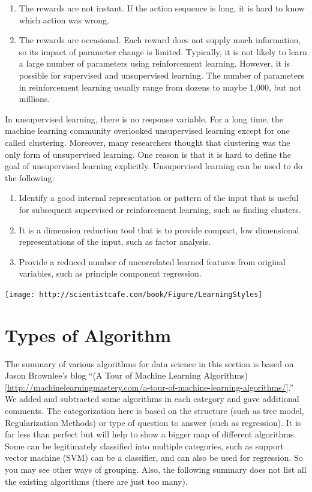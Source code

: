 \documentclass[]{book}
\theoremstyle{definition}
\theoremstyle{definition}
\theoremstyle{remark}
\begin{document}
\begin{enumerate}
\def\labelenumi{(\arabic{enumi})}
\item
  The rewards are not instant. If the action sequence is long, it is
  hard to know which action was wrong.
\item
  The rewards are occasional. Each reward does not supply much
  information, so its impact of parameter change is limited. Typically,
  it is not likely to learn a large number of parameters using
  reinforcement learning. However, it is possible for supervised and
  unsupervised learning. The number of parameters in reinforcement
  learning usually range from dozens to maybe 1,000, but not millions.
\end{enumerate}

In unsupervised learning, there is no response variable. For a long
time, the machine learning community overlooked unsupervised learning
except for one called clustering. Moreover, many researchers thought
that clustering was the only form of unsupervised learning. One reason
is that it is hard to define the goal of unsupervised learning
explicitly. Unsupervised learning can be used to do the following:

\begin{enumerate}
\def\labelenumi{(\arabic{enumi})}
\item
  Identify a good internal representation or pattern of the input that
  is useful for subsequent supervised or reinforcement learning, such as
  finding clusters.
\item
  It is a dimension reduction tool that is to provide compact, low
  dimensional representations of the input, such as factor analysis.
\item
  Provide a reduced number of uncorrelated learned features from
  original variables, such as principle component regression.
\end{enumerate}

\texttt{[image: http://scientistcafe.com/book/Figure/LearningStyles]}

\section{Types of Algorithm}\label{types-of-algorithm}

The summary of various algorithms for data science in this section is
based on Jason Brownlee's blog ``(A Tour of Machine Learning
Algorithms){[}\url{http://machinelearningmastery.com/a-tour-of-machine-learning-algorithms/}{]}.''
We added and subtracted some algorithms in each category and gave
additional comments. The categorization here is based on the structure
(such as tree model, Regularization Methods) or type of question to
answer (such as regression). It is far less than perfect but will help
to show a bigger map of different algorithms. Some can be legitimately
classified into multiple categories, such as support vector machine
(SVM) can be a classifier, and can also be used for regression. So you
may see other ways of grouping. Also, the following summary does not
list all the existing algorithms (there are just too many).
\end{document}
